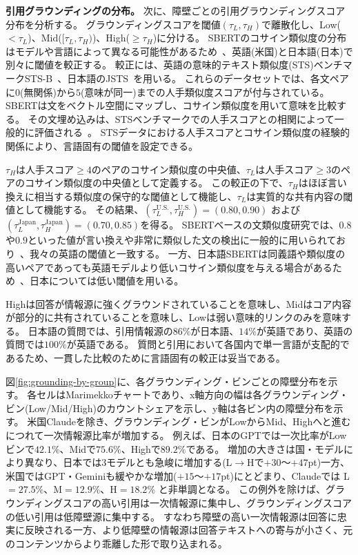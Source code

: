 \textbf{引用グラウンディングの分布。}
次に、障壁ごとの引用グラウンディングスコア分布を分析する。
グラウンディングスコアを閾値$(\tau_L, \tau_H)$で離散化し、Low($<\tau_L$)、Mid($[\tau_L, \tau_H)$)、High($\geq \tau_H$)に分ける。
SBERTのコサイン類似度の分布はモデルや言語によって異なる可能性があるため~\cite{primer2023multilingual,shibayama2021japanesesbert}、英語(米国)と日本語(日本)で別々に閾値を較正する。
較正には、英語の意味的テキスト類似度(STS)ベンチマークSTS-B~\cite{cer2017stsb}、日本語のJSTS~\cite{kurihara2022jglue}を用いる。
これらのデータセットでは、各文ペアに$0$(無関係)から$5$(意味が同一)までの人手類似度スコアが付与されている。
SBERTは文をベクトル空間にマップし、コサイン類似度を用いて意味を比較する。
その文埋め込みは、STSベンチマークでの人手スコアとの相関によって一般的に評価される~\cite{reimers2019sbert}。
STSデータにおける人手スコアとコサイン類似度の経験的関係により、言語固有の閾値を設定できる。

$\tau_H$は人手スコア$\geq 4$のペアのコサイン類似度の中央値、$\tau_L$は人手スコア$\geq 3$のペアのコサイン類似度の中央値として定義する。
この較正の下で、$\tau_H$はほぼ言い換えに相当する類似度の保守的な閾値として機能し、$\tau_L$は実質的な共有内容の閾値として機能する。
その結果、$(\tau_L^{\text{U.S.}}, \tau_H^{\text{U.S.}}) = (0.80, 0.90)$ および $(\tau_L^{\text{Japan}}, \tau_H^{\text{Japan}}) = (0.70, 0.85)$を得る。
SBERTベースの文類似度研究では、$0.8$や$0.9$といった値が言い換えや非常に類似した文の検出に一般的に用いられており~\cite{kabir2024banglaembed,tumre2025improved}、我々の英語の閾値と一致する。
一方、日本語SBERTは同義語や類似度の高いペアであっても英語モデルより低いコサイン類似度を与える場合があるため~\cite{shibayama2021japanesesbert}、日本については低い閾値を用いる。

Highは回答が情報源に強くグラウンドされていることを意味し、Midはコア内容が部分的に共有されていることを意味し、Lowは弱い意味的リンクのみを意味する。
日本語の質問では、引用情報源の$86\%$が日本語、$14\%$が英語であり、英語の質問では$100\%$が英語である。
質問と引用において各国内で単一言語が支配的であるため、一貫した比較のために言語固有の較正は妥当である。

図\ref{fig:grounding-by-group}に、各グラウンディング・ビンごとの障壁分布を示す。
各セルはMarimekkoチャートであり、x軸方向の幅は各グラウンディング・ビン(Low/Mid/High)のカウントシェアを示し、y軸は各ビン内の障壁分布を示す。
米国Claudeを除き、グラウンディング・ビンがLowからMid、Highへと進むにつれて一次情報源比率が増加する。
例えば、日本のGPTでは一次比率がLowビンで$42.1\%$、Midで$75.6\%$、Highで$89.2\%$である。
増加の大きさは国・モデルにより異なり、日本では3モデルとも急峻に増加する(L$\to$Hで$+30$〜$+47$pt)一方、米国ではGPT・Geminiも緩やかな増加(${+}15$〜${+}17$pt)にとどまり、Claudeでは L$=27.5\%$、M$=12.9\%$、H$=18.2\%$ と非単調となる。
この例外を除けば、グラウンディングスコアの高い引用は一次情報源に集中し、グラウンディングスコアの低い引用は低障壁源に集中する。
すなわち障壁の高い一次情報源は回答に忠実に反映される一方、より低障壁の情報源は回答テキストへの寄与が小さく、元のコンテンツからより乖離した形で取り込まれる。

